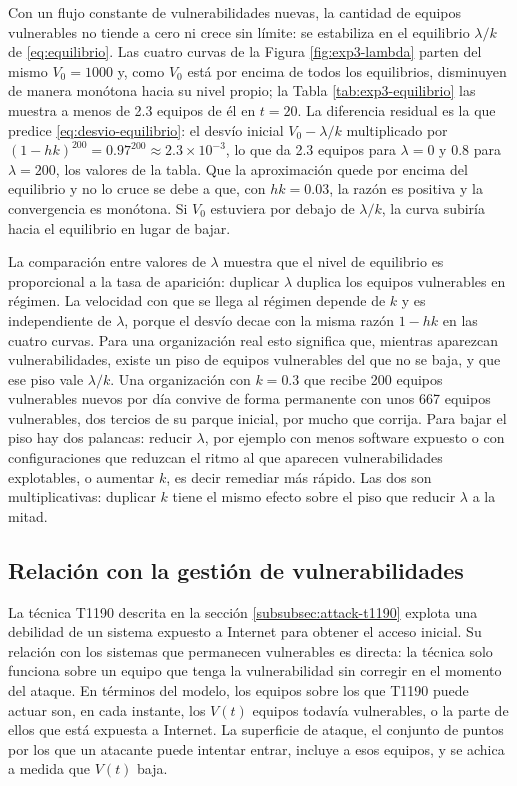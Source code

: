 Con un flujo constante de vulnerabilidades nuevas, la cantidad de equipos vulnerables no tiende
a cero ni crece sin límite: se estabiliza en el equilibrio $\lambda/k$ de \eqref{eq:equilibrio}.
Las cuatro curvas de la Figura \ref{fig:exp3-lambda} parten del mismo $V_0 = 1000$ y, como
$V_0$ está por encima de todos los equilibrios, disminuyen de manera monótona hacia su nivel
propio; la Tabla \ref{tab:exp3-equilibrio} las muestra a menos de 2.3 equipos de él en $t = 20$.
La diferencia residual es la que predice \eqref{eq:desvio-equilibrio}: el desvío inicial
$V_0 - \lambda/k$ multiplicado por $(1 - hk)^{200} = 0.97^{200} \approx 2.3 \times 10^{-3}$,
lo que da 2.3 equipos para $\lambda = 0$ y 0.8 para $\lambda = 200$, los valores de la tabla.
Que la aproximación quede por encima del equilibrio y no lo cruce se debe a que, con $hk = 0.03$,
la razón es positiva y la convergencia es monótona. Si $V_0$ estuviera por debajo de
$\lambda/k$, la curva subiría hacia el equilibrio en lugar de bajar.

La comparación entre valores de $\lambda$ muestra que el nivel de equilibrio es proporcional a
la tasa de aparición: duplicar $\lambda$ duplica los equipos vulnerables en régimen. La
velocidad con que se llega al régimen depende de $k$ y es independiente de $\lambda$, porque el
desvío decae con la misma razón $1 - hk$ en las cuatro curvas. Para una organización real esto
significa que, mientras aparezcan vulnerabilidades, existe un piso de equipos vulnerables del
que no se baja, y que ese piso vale $\lambda/k$. Una organización con $k = 0.3$ que recibe 200
equipos vulnerables nuevos por día convive de forma permanente con unos 667 equipos
vulnerables, dos tercios de su parque inicial, por mucho que corrija. Para bajar el piso hay
dos palancas: reducir $\lambda$, por ejemplo con menos software expuesto o con configuraciones
que reduzcan el ritmo al que aparecen vulnerabilidades explotables, o aumentar $k$, es decir
remediar más rápido. Las dos son multiplicativas: duplicar $k$ tiene el mismo efecto sobre el
piso que reducir $\lambda$ a la mitad.

\subsection{Relación con la gestión de vulnerabilidades}
\label{subsec:dis-gestion}

La técnica T1190 descrita en la sección \ref{subsubsec:attack-t1190} explota una debilidad de
un sistema expuesto a Internet para obtener el acceso inicial. Su relación con los sistemas que
permanecen vulnerables es directa: la técnica solo funciona sobre un equipo que tenga la
vulnerabilidad sin corregir en el momento del ataque. En términos del modelo, los equipos sobre
los que T1190 puede actuar son, en cada instante, los $V(t)$ equipos todavía vulnerables, o la
parte de ellos que está expuesta a Internet. La superficie de ataque, el conjunto de puntos por
los que un atacante puede intentar entrar, incluye a esos equipos, y se achica a medida que
$V(t)$ baja.

